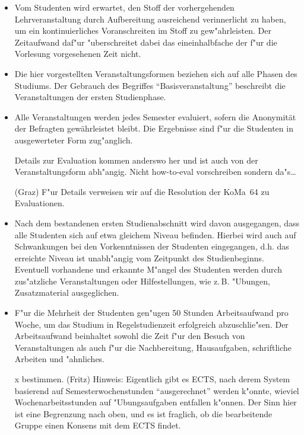 \begin{itemize}
\item	Vom Studenten wird erwartet, den Stoff der vorhergehenden Lehrveranstaltung durch
	Aufbereitung ausreichend verinnerlicht zu haben, um ein kontinuierliches Voranschreiten
	im Stoff zu gew"ahrleisten. Der Zeitaufwand daf"ur "uberschreitet dabei das 
	eineinhalbfache der f"ur die Vorlesung vorgesehenen Zeit nicht.

\item	Die hier vorgestellten Veranstaltungsformen beziehen sich auf alle Phasen des Studiums.
	Der Gebrauch des Begriffes "`Basisveranstaltung"' beschreibt die Veranstaltungen der
	ersten Studienphase.
	
\item	Alle Veranstaltungen werden jedes Semester evaluiert, sofern die Anonymität der Befragten gewährleistet bleibt. Die Ergebnisse sind f"ur die Studenten in ausgewerteter Form zug"anglich.

\begin{kcmt}\begin{komacmt}
	Details zur Evaluation kommen anderswo her und ist auch von der Veranstaltungsform abh"angig.
	Nicht how-to-eval vorschreiben sondern da"s\dots

	(Graz) F"ur Details verweisen wir auf die Resolution der KoMa~64 zu Evaluationen.
\end{komacmt}\end{kcmt}

\item	Nach dem bestandenen ersten Studienabschnitt wird davon ausgegangen, dass alle Studenten 
	sich auf etwa gleichem Niveau befinden. Hierbei wird auch auf Schwankungen bei den
	Vorkenntnissen der Studenten eingegangen, d.h. das erreichte Niveau ist unabh"angig
	vom Zeitpunkt des Studienbeginns. Eventuell vorhandene und erkannte M"angel des Studenten
	werden durch zus"atzliche Veranstaltungen oder Hilfestellungen, wie z.\,B. "Ubungen, Zusatzmaterial ausgeglichen.

\item	F"ur die Mehrheit der Studenten gen"ugen 50 Stunden Arbeitsaufwand pro Woche, um das Studium in Regelstudienzeit erfolgreich abzuschlie"sen.
	Der Arbeitsaufwand beinhaltet sowohl die Zeit f"ur den Besuch von Veranstaltungen als auch f"ur die Nachbereitung, Hausaufgaben, schriftliche Arbeiten und "ahnliches.
\begin{kcmt}\begin{komacmt}
	x bestimmen. (Fritz) Hinweis: Eigentlich gibt es ECTS, nach derem System basierend auf
	Semesterwochenstunden "`ausgerechnet"' werden k"onnte, wieviel Wochenarbeitsstunden auf
	"Ubungsaufgaben entfallen k"onnen. Der Sinn hier ist eine Begrenzung nach oben, und es
	ist fraglich, ob die bearbeitende Gruppe einen Konsens mit dem ECTS findet.
\end{komacmt}\end{kcmt}
\end{itemize}

